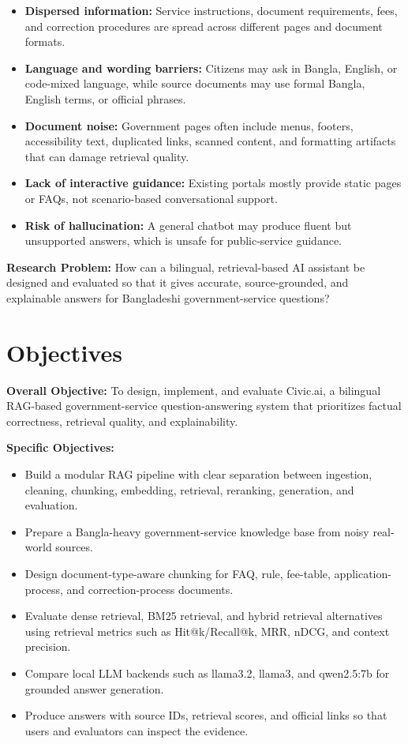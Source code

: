 \begin{itemize}
    \item \textbf{Dispersed information:} Service instructions, document requirements, fees, and correction procedures are spread across different pages and document formats.
    \item \textbf{Language and wording barriers:} Citizens may ask in Bangla, English, or code-mixed language, while source documents may use formal Bangla, English terms, or official phrases.
    \item \textbf{Document noise:} Government pages often include menus, footers, accessibility text, duplicated links, scanned content, and formatting artifacts that can damage retrieval quality.
    \item \textbf{Lack of interactive guidance:} Existing portals mostly provide static pages or FAQs, not scenario-based conversational support.
    \item \textbf{Risk of hallucination:} A general chatbot may produce fluent but unsupported answers, which is unsafe for public-service guidance.
\end{itemize}

\textbf{Research Problem:} How can a bilingual, retrieval-based AI assistant be designed and evaluated so that it gives accurate, source-grounded, and explainable answers for Bangladeshi government-service questions?

\section{Objectives}
\textbf{Overall Objective:} To design, implement, and evaluate Civic.ai, a bilingual RAG-based government-service question-answering system that prioritizes factual correctness, retrieval quality, and explainability.

\textbf{Specific Objectives:}
\begin{itemize}
    \item Build a modular RAG pipeline with clear separation between ingestion, cleaning, chunking, embedding, retrieval, reranking, generation, and evaluation.
    \item Prepare a Bangla-heavy government-service knowledge base from noisy real-world sources.
    \item Design document-type-aware chunking for FAQ, rule, fee-table, application-process, and correction-process documents.
    \item Evaluate dense retrieval, BM25 retrieval, and hybrid retrieval alternatives using retrieval metrics such as Hit@k/Recall@k, MRR, nDCG, and context precision.
    \item Compare local LLM backends such as llama3.2, llama3, and qwen2.5:7b for grounded answer generation.
    \item Produce answers with source IDs, retrieval scores, and official links so that users and evaluators can inspect the evidence.
\end{itemize}

